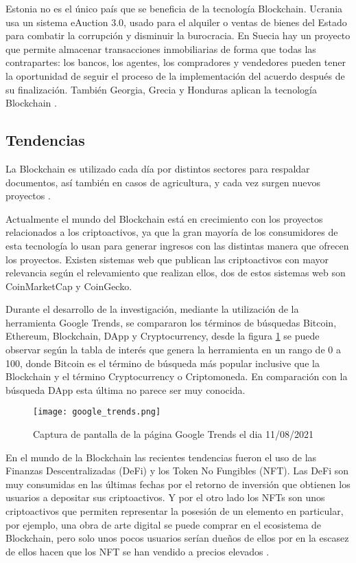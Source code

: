 Estonia no es el único país que se beneficia de la tecnología  Blockchain. Ucrania usa un sistema 
eAuction 3.0, usado para el alquiler o ventas de bienes del Estado para combatir 
la corrupción y disminuir la burocracia.
En Suecia hay un proyecto que permite almacenar transacciones inmobiliarias
de forma que todas las contrapartes: los bancos, los agentes, los compradores y vendedores  pueden 
tener la oportunidad de seguir el proceso de la implementación del acuerdo después de su finalización.
También  Georgia, Grecia y Honduras aplican la tecnología
Blockchain \cite[]{brys_cadena_2019}.

\subsection{Tendencias}


 La Blockchain  es utilizado cada día  por distintos sectores para respaldar 
documentos, así también en casos de agricultura, y cada vez surgen nuevos proyectos \cite[]{Blockchain_federal_argentina_trazabilidad_nodate}. 

Actualmente el mundo del  Blockchain está en crecimiento con los proyectos relacionados a los 
criptoactivos, ya que la gran mayoría de los consumidores de esta tecnología lo usan para generar ingresos con las distintas manera que  ofrecen los proyectos.
Existen sistemas web que publican las criptoactivos con mayor relevancia según el relevamiento que realizan ellos, 
dos de estos sistemas web son CoinMarketCap y CoinGecko.

Durante el desarrollo de la investigación, mediante  la utilización de la herramienta Google Trends,
se compararon los términos de búsquedas  Bitcoin, Ethereum, Blockchain, DApp y Cryptocurrency, desde  la figura  \ref{img:google_trends} 
 se puede observar según la tabla de interés que genera la herramienta en un rango de 0 a 100, donde Bitcoin es el 
término de búsqueda más popular inclusive que la Blockchain y el término Cryptocurrency o Criptomoneda. En comparación con la búsqueda DApp esta última
no parece ser muy conocida.  


\begin{figure}[H]
    \centering
    {\texttt{[image: google\_trends.png]}}
    \caption{Captura de pantalla de la  página Google Trends el dia 11/08/2021 } 
    \label{img:google_trends}
\end{figure}

En el mundo de la Blockchain las recientes tendencias fueron el uso de las Finanzas Descentralizadas (DeFi) y 
los Token No Fungibles (NFT). Las DeFi son muy consumidas en las últimas fechas por el retorno
de inversión que obtienen los usuarios a depositar sus criptoactivos. Y por el otro lado los NFTs
son unos criptoactivos que permiten representar la posesión de un elemento en particular, por ejemplo,
una obra de arte digital se puede comprar en el ecosistema de Blockchain, pero solo unos pocos usuarios serían dueños de ellos 
por en la escasez de ellos hacen que los NFT se han vendido a precios elevados \cite[]{brys_cadena_2019,cripto247_2021_2021}.

